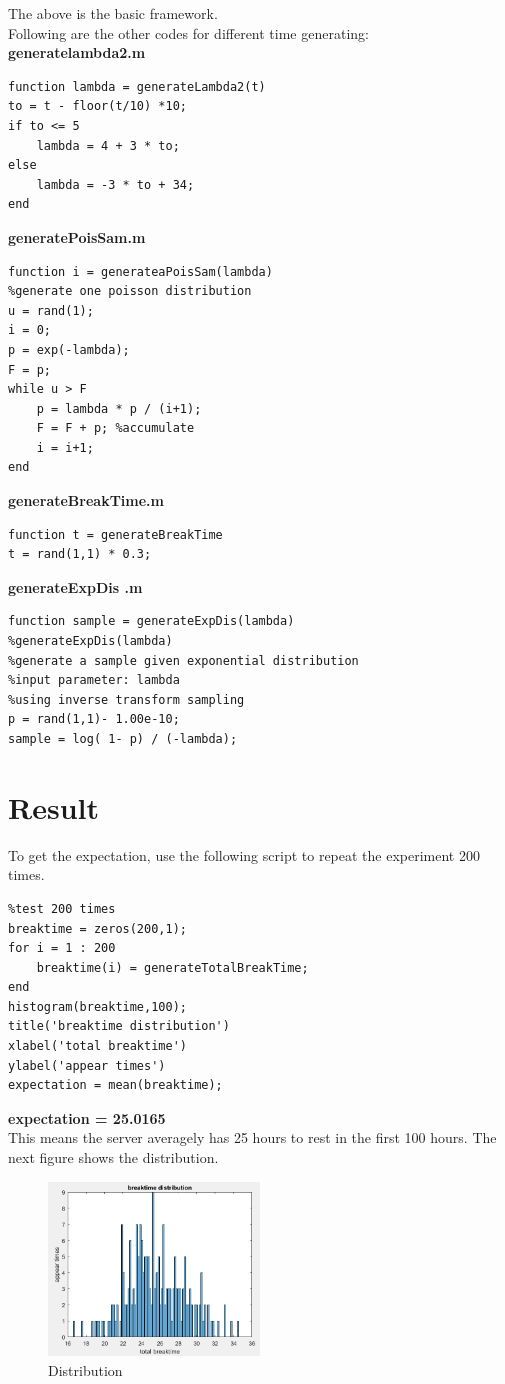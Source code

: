 \documentclass[twoside]{article}
\begin{document}
The above is the basic framework.\\
Following are the other codes for different time generating:\\
\noindent \textbf {generatelambda2.m}
\begin{lstlisting}
function lambda = generateLambda2(t)
to = t - floor(t/10) *10;
if to <= 5 
    lambda = 4 + 3 * to;
else
    lambda = -3 * to + 34;
end
\end{lstlisting}
\noindent \textbf {generatePoisSam.m}
\begin{lstlisting}
function i = generateaPoisSam(lambda)
%generate one poisson distribution
u = rand(1);
i = 0;
p = exp(-lambda);
F = p;
while u > F
    p = lambda * p / (i+1);
    F = F + p; %accumulate
    i = i+1;
end
\end{lstlisting}
\noindent \textbf {generateBreakTime.m}
\begin{lstlisting}
function t = generateBreakTime
t = rand(1,1) * 0.3;
\end{lstlisting}
\noindent \textbf {generateExpDis .m}
\begin{lstlisting}
function sample = generateExpDis(lambda)
%generateExpDis(lambda)
%generate a sample given exponential distribution
%input parameter: lambda
%using inverse transform sampling
p = rand(1,1)- 1.00e-10;
sample = log( 1- p) / (-lambda);
\end{lstlisting}

\section{Result}
To get the expectation, use the following script to repeat the experiment 200 times.\\
\begin{lstlisting}
%test 200 times 
breaktime = zeros(200,1);
for i = 1 : 200 
    breaktime(i) = generateTotalBreakTime;
end
histogram(breaktime,100);
title('breaktime distribution')
xlabel('total breaktime')
ylabel('appear times')
expectation = mean(breaktime);
\end{lstlisting}
\begin{multicols}{2}
\noindent \textbf {expectation = 25.0165} \\
This means the server averagely has 25 hours to rest in the first 100 hours. The next figure shows the distribution.
\begin{figure}[H]
    \centering
    \includegraphics[width = 0.5\textwidth]{./data/breaktimeDistribution.png}  
    \caption{Distribution}
 \end{figure} 
\end{multicols}
\end{document}
